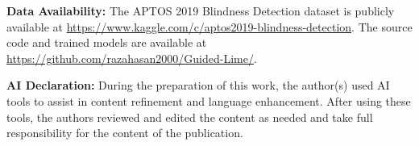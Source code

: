 \documentclass[10pt,twoside]{article}
\begin{document}
\textbf{Data Availability:} The APTOS 2019 Blindness Detection dataset is publicly available at \url{https://www.kaggle.com/c/aptos2019-blindness-detection}. The source code and trained models are available at \url{https://github.com/razahasan2000/Guided-Lime/}.

\textbf{AI Declaration:} During the preparation of this work, the author(s) used AI tools to assist in content refinement and language enhancement. After using these tools, the authors reviewed and edited the content as needed and take full responsibility for the content of the publication.



\end{document}
